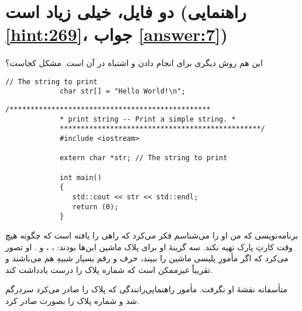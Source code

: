 \section[دو فایل، خیلی زیاد است]{دو فایل، خیلی زیاد است \protect{} (راهنمایی \ref{hint:269}، جواب \ref{answer:7})}
\paragraph{}\label{prog:11}
این هم روش دیگری برای انجام دادن  و اشتباه در آن است. مشکل کجاست؟

\begin{LTR}
        \begin{lstlisting}[style=C++Style]
             // The string to print
             char str[] = "Hello World!\n";
        \end{lstlisting}
\end{LTR}

\begin{LTR}
        \begin{lstlisting}[style=C++Style]
             /************************************************
             * print string -- Print a simple string. *
             ************************************************/
             #include <iostream>

             extern char *str; // The string to print

             int main()
             {
             	std::cout << str << std::endl;
             	return (0);
             }
        \end{lstlisting}
\end{LTR}

\begin{tcolorbox}
    برنامه‌نویسی که من او را می‌شناسم فکر می‌کرد که راهی را یافته است که چگونه هیچ وقت کارتِ پارک تهیه نکند. سه گزینهٔ او برای پلاک ماشین این‌ها بودند: ، ، و . او تصور می‌کرد که اگر مأمورِ پلیسی ماشین را ببیند، حرف  و رقم  بسیار شبیهِ هم می‌باشند و تقریباً غیرممکن است که شماره پلاک را درست یادداشت کند.

    متأسفانه نقشهٔ او نگرفت. مأمور راهنمایی‌رانندگی که پلاک را صادر می‌کرد سردرگم شد و شماره پلاک را بصورت  صادر کرد.
\end{tcolorbox}